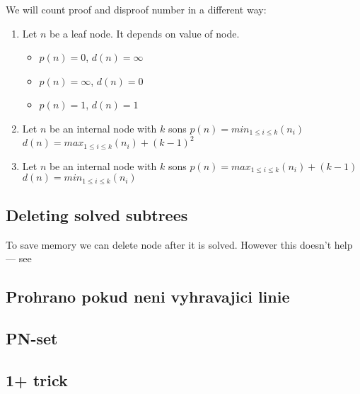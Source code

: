 We will count proof and disproof number in a different way:
\begin{enumerate} 
	\item Let $n$ be a leaf node. It depends on value of node.
		\begin{itemize}
			\item \value{true} $p(n)=0$, $d(n)=\infty$
			\item \value{false} $p(n)=\infty$, $d(n)=0$
			\item \value{unknown} $p(n)=1$, $d(n)=1$
		\end{itemize}
	\item Let $n$ be an internal  node with $k$ sons \newline
		$p(n) = min_{1 \le i \le k}(n_i)$ \newline
		$d(n) = max_{1 \le i \le k}(n_i) + (k-1)^2$ 
	\item Let $n$ be an internal  node with $k$ sons\newline
		$p(n) = max_{1 \le i \le k}(n_i) + (k-1)$ \newline 
		$d(n) = min_{1 \le i \le k}(n_i)$
\end{enumerate}
		
\subsection{Deleting solved subtrees}

To save memory we can delete node after it is solved. However this doesn't 
help --- see 

\subsection{ Prohrano pokud neni vyhravajici linie}

\subsection{PN-set}

\subsection{1+ trick}



